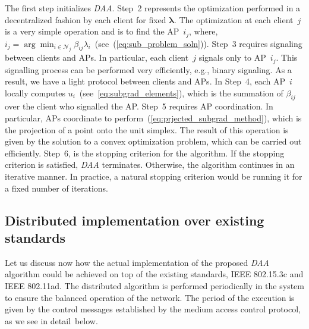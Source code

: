 \documentclass[journal, 10pt, twocolumn]{IEEEtran}
\begin{document}
The first step initializes \emph{DAA}. Step~2 represents the optimization performed in a decentralized fashion by each client for fixed $\boldsymbol \lambda$. The optimization at each client~$j$ is a very simple operation and is to find the AP~$i_j$, where, $i_j=\arg\min_{i\in\mathcal{N}_j}\beta_{ij}\lambda_i$~(see~(\ref{eq:sub_problem_soln})). Step~3 requires signaling between clients and APs. In particular, each client~$j$ signals only to AP~$i_j$. This signalling process can be performed very efficiently, e.g., binary signaling. As a result, we have a light protocol between clients and APs. In Step~4, each AP~$i$ locally computes $u_i$~(see~\ref{eq:subgrad_elements}), which is the summation of $\beta_{ij}$ over the client who signalled the AP. Step~5 requires AP coordination. In particular, APs coordinate to perform~(\ref{eq:prjected_subgrad_method}), which is the projection of a point onto the unit simplex. The result of this operation is given by the solution to a convex optimization problem, which can be carried out efficiently. Step~6, is the stopping criterion for the algorithm. If the stopping criterion is satisfied, \emph{DAA} terminates. Otherwise, the algorithm continues in an iterative manner. In practice, a natural stopping criterion would be running it for a fixed number of iterations.

\subsection{Distributed implementation over existing standards}\label{subsec:DAA_over_standards}

Let us discuss now how the actual implementation of the proposed \emph{DAA} algorithm could be achieved on top of the existing standards, IEEE 802.15.3c and IEEE 802.11ad. The distributed algorithm is performed periodically in the system to ensure the balanced operation of the network. The period of the execution is given by the control messages established by the medium access control protocol, as we see in detail~below.
\end{document}
